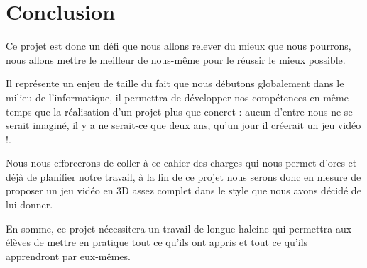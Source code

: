 \documentclass[12pt,a4paper]{article}
\begin{document}
\section{Conclusion}
Ce projet est donc un défi que nous allons relever du mieux que nous pourrons, nous allons mettre le meilleur de nous-même pour le réussir le mieux possible.

Il représente un enjeu de taille du fait que nous débutons globalement dans le milieu de l'informatique, il permettra de développer nos compétences en même temps que la réalisation d'un projet plus que concret : aucun d'entre nous ne se serait imaginé, il y a ne serait-ce que deux ans, qu'un jour il créerait un jeu vidéo !.

Nous nous efforcerons de coller à ce cahier des charges qui nous permet d'ores et déjà de planifier notre travail, à la fin de ce projet nous serons donc en mesure de proposer un jeu vidéo en 3D assez complet dans le style que nous avons décidé de lui donner.

En somme, ce projet nécessitera un travail de longue haleine qui permettra aux élèves de mettre en pratique tout ce qu'ils ont appris et tout ce qu'ils apprendront par eux-mêmes.
\end{document}
